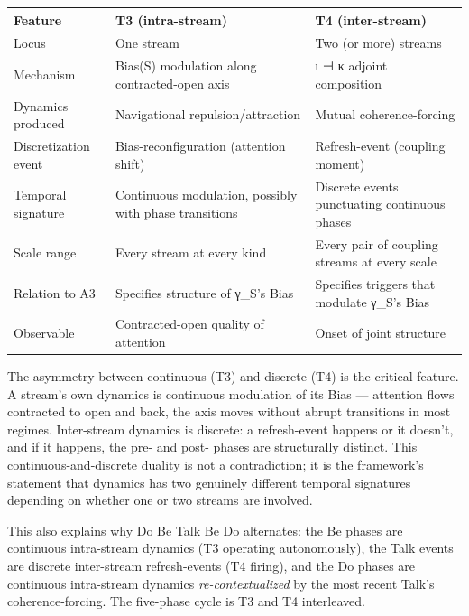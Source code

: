 \documentclass[11pt, openany]{book}
\begin{document}
\begingroup\setlength{\tabcolsep}{3pt}\renewcommand{\arraystretch}{1.15}\footnotesize
\begin{center}
\begin{tabular}{p{0.73in} p{1.97in} p{1.64in}}
\toprule
Feature & T3 (intra-stream) & T4 (inter-stream) \\
\midrule
Locus & One stream & Two (or more) streams \\
Mechanism & Bias(S) modulation along contracted-open axis & ι ⊣ κ adjoint composition \\
Dynamics produced & Navigational repulsion/\allowbreak attraction & Mutual coherence-forcing \\
Discretization event & Bias-reconfiguration (attention shift) & Refresh-event (coupling moment) \\
Temporal signature & Continuous modulation, possibly with phase transitions & Discrete events punctuating continuous phases \\
Scale range & Every stream at every kind & Every pair of coupling streams at every scale \\
Relation to A3 & Specifies structure of γ\_\allowbreak{}S's Bias & Specifies triggers that modulate γ\_\allowbreak{}S's Bias \\
Observable & Contracted-open quality of attention & Onset of joint structure \\
\bottomrule
\end{tabular}
\end{center}
\endgroup
The asymmetry between continuous (T3) and discrete (T4) is the critical feature. A stream's own dynamics is continuous modulation of its Bias --- attention flows contracted to open and back, the axis moves without abrupt transitions in most regimes. Inter-stream dynamics is discrete: a refresh-event happens or it doesn't, and if it happens, the pre- and post- phases are structurally distinct. This continuous-and-discrete duality is not a contradiction; it is the framework's statement that dynamics has two genuinely different temporal signatures depending on whether one or two streams are involved.

This also explains why Do Be Talk Be Do alternates: the Be phases are continuous intra-stream dynamics (T3 operating autonomously), the Talk events are discrete inter-stream refresh-events (T4 firing), and the Do phases are continuous intra-stream dynamics \textit{re-contextualized} by the most recent Talk's coherence-forcing. The five-phase cycle is T3 and T4 interleaved.
\end{document}
